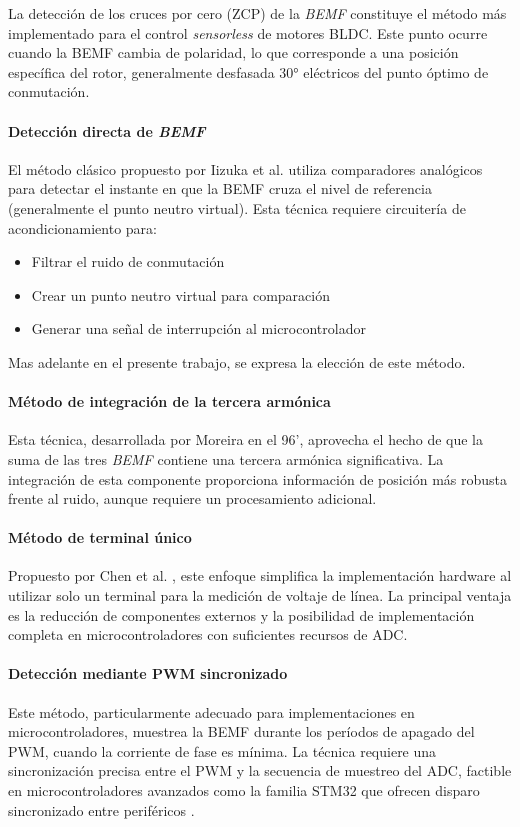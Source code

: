 La detección de los cruces por cero (ZCP) de la \textit{BEMF} constituye el método más implementado para el control \textit{sensorless} de motores BLDC. Este punto ocurre cuando la BEMF cambia de polaridad, lo que corresponde a una posición específica del rotor, generalmente desfasada 30° eléctricos del punto óptimo de conmutación.

\paragraph{Detección directa de \textit{BEMF}}
El método clásico propuesto por Iizuka et al. \cite{Iizuka1985} utiliza comparadores analógicos para detectar el instante en que la BEMF cruza el nivel de referencia (generalmente el punto neutro virtual). Esta técnica requiere circuitería de acondicionamiento para:

\begin{itemize}
    \item Filtrar el ruido de conmutación
    \item Crear un punto neutro virtual para comparación
    \item Generar una señal de interrupción al microcontrolador
\end{itemize}
Mas adelante en el presente trabajo, se expresa la elección de este método.
\paragraph{Método de integración de la tercera armónica}
Esta técnica, desarrollada por Moreira en el 96'\cite{Moreira1996}, aprovecha el hecho de que la suma de las tres \textit{BEMF} contiene una tercera armónica significativa. La integración de esta componente proporciona información de posición más robusta frente al ruido, aunque requiere un procesamiento adicional.

\paragraph{Método de terminal único}
Propuesto por Chen et al. \cite{Chen2007}, este enfoque simplifica la implementación hardware al utilizar solo un terminal para la medición de voltaje de línea. La principal ventaja es la reducción de componentes externos y la posibilidad de implementación completa en microcontroladores con suficientes recursos de ADC.

\paragraph{Detección mediante PWM sincronizado}
Este método, particularmente adecuado para implementaciones en microcontroladores, muestrea la BEMF durante los períodos de apagado del PWM, cuando la corriente de fase es mínima. La técnica requiere una sincronización precisa entre el PWM y la secuencia de muestreo del ADC, factible en microcontroladores avanzados como la familia STM32 que ofrecen disparo sincronizado entre periféricos \cite{STM32F103_RM}.

